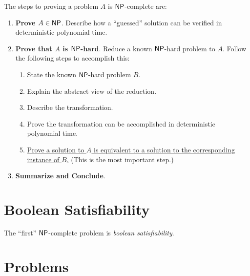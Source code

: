 The steps to proving a problem $A$ is $\textsf{NP}$-complete are:
\begin{enumerate}
	\item \textbf{Prove $A \in \textsf{NP}$}. Describe how a ``guessed'' solution can be verified in deterministic polynomial time.
	\item \textbf{Prove that $A$ is $\textsf{NP}$-hard}. Reduce a known $\textsf{NP}$-hard problem to $A$. Follow the following steps to accomplish this:
	\begin{enumerate}
		\item State the known $\textsf{NP}$-hard problem $B$.
		\item Explain the abstract view of the reduction.
		\item Describe the transformation.
		\item Prove the transformation can be accomplished in deterministic polynomial time.
		\item \underline{Prove a solution to $A$ is equivalent to a solution to the corresponding instance of $B$.} (This is the most important step.)
	\end{enumerate}
	\item \textbf{Summarize and Conclude}.
\end{enumerate}

\section{Boolean Satisfiability}

The ``first'' $\textsf{NP}$-complete problem is \emph{boolean satisfiability}.


\section{Problems}
